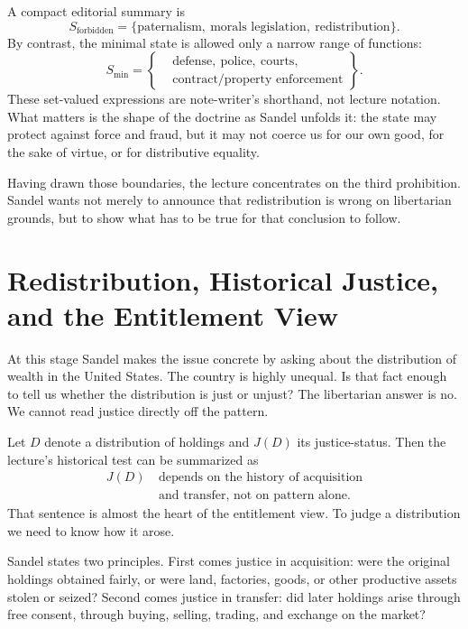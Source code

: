 A compact editorial summary is
\begin{equation}
S_{\mathrm{forbidden}}=\{\text{paternalism},\ \text{morals legislation},\ \text{redistribution}\}.
\end{equation}
By contrast, the minimal state is allowed only a narrow range of functions:
\begin{equation}
S_{\min}=
\left\{
\begin{aligned}
&\text{defense},\ \text{police},\ \text{courts}, \\
&\text{contract/property enforcement}
\end{aligned}
\right\}.
\end{equation}
These set-valued expressions are note-writer's shorthand, not lecture notation. What matters is the shape of the doctrine as Sandel unfolds it: the state may protect against force and fraud, but it may not coerce us for our own good, for the sake of virtue, or for distributive equality.

Having drawn those boundaries, the lecture concentrates on the third prohibition. Sandel wants not merely to announce that redistribution is wrong on libertarian grounds, but to show what has to be true for that conclusion to follow.

\section{Redistribution, Historical Justice, and the Entitlement View}

At this stage Sandel makes the issue concrete by asking about the distribution of wealth in the United States. The country is highly unequal. Is that fact enough to tell us whether the distribution is just or unjust? The libertarian answer is no. We cannot read justice directly off the pattern.

Let \(D\) denote a distribution of holdings and \(J(D)\) its justice-status. Then the lecture's historical test can be summarized as
\begin{equation}
\begin{aligned}
J(D)\ &\text{depends on the history of acquisition} \\
&\text{and transfer, not on pattern alone}.
\end{aligned}
\end{equation}
That sentence is almost the heart of the entitlement view. To judge a distribution we need to know how it arose.

Sandel states two principles. First comes justice in acquisition: were the original holdings obtained fairly, or were land, factories, goods, or other productive assets stolen or seized? Second comes justice in transfer: did later holdings arise through free consent, through buying, selling, trading, and exchange on the market?

